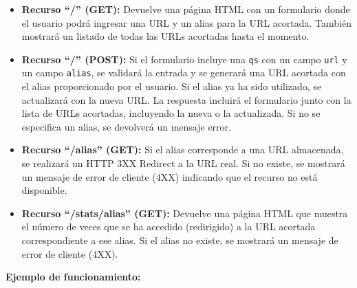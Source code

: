 \begin{itemize}
    \item \textbf{Recurso ``/'' (GET):} Devuelve una página HTML con un formulario donde el usuario podrá ingresar una URL y un alias para la URL acortada. También mostrará un listado de todas las URLs acortadas hasta el momento.
    
    \item \textbf{Recurso ``/'' (POST):} Si el formulario incluye una \texttt{qs} con un campo \texttt{url} y un campo \texttt{alias}, se validará la entrada y se generará una URL acortada con el alias proporcionado por el usuario. Si el alias ya ha sido utilizado, se actualizará con la nueva URL. La respuesta incluirá el formulario junto con la lista de URLs acortadas, incluyendo la nueva o la actualizada. Si no se especifica un alias, se devolverá un mensaje error.
    
    \item \textbf{Recurso ``/alias'' (GET):} Si el alias corresponde a una URL almacenada, se realizará un HTTP 3XX Redirect a la URL real. Si no existe, se mostrará un mensaje de error de cliente (4XX) indicando que el recurso no está disponible.
    
    \item \textbf{Recurso ``/stats/alias'' (GET):} Devuelve una página HTML que muestra el número de veces que se ha accedido (redirigido) a la URL acortada correspondiente a ese alias. Si el alias no existe, se mostrará un mensaje de error de cliente (4XX).
\end{itemize}

\textbf{Ejemplo de funcionamiento:}

